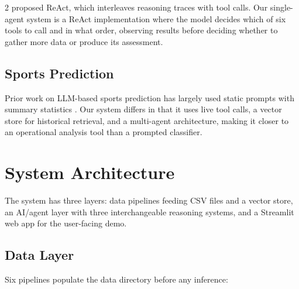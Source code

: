 \documentclass[11pt]{article}
\begin{document}
\begin{multicols}{2}
\citet{yao2023} proposed ReAct, which interleaves reasoning traces with tool calls. Our single-agent system is a ReAct implementation where the model decides which of six tools to call and in what order, observing results before deciding whether to gather more data or produce its assessment.

\subsection{Sports Prediction}

Prior work on LLM-based sports prediction has largely used static prompts with summary statistics \citep{kadavath2022}. Our system differs in that it uses live tool calls, a vector store for historical retrieval, and a multi-agent architecture, making it closer to an operational analysis tool than a prompted classifier.

\section{System Architecture}

The system has three layers: data pipelines feeding CSV files and a vector store, an AI/agent layer with three interchangeable reasoning systems, and a Streamlit web app for the user-facing demo.

\subsection{Data Layer}

Six pipelines populate the data directory before any inference:


\end{multicols}
\end{document}
